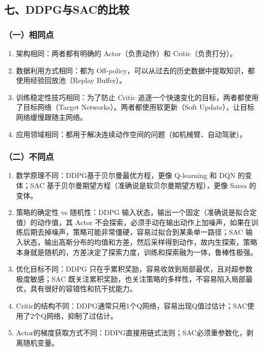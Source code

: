 \hypertarget{ux4e03ddpgux4e0esacux7684ux6bd4ux8f83}{%
\subsection{七、DDPG与SAC的比较}\label{ux4e03ddpgux4e0esacux7684ux6bd4ux8f83}}

\hypertarget{ux4e00ux76f8ux540cux70b9}{%
\subsubsection{（一）相同点}\label{ux4e00ux76f8ux540cux70b9}}

\begin{enumerate}
\def\labelenumi{\arabic{enumi}.}
\item
  架构相同：两者都有明确的 Actor（负责动作）和 Critic（负责打分）。
\item
  数据利用方式相同：都为 Off-policy，可以从过去的历史数据中提取知识，都使用经验回放池（Replay Buffer）。
\item
  训练稳定性技巧相同：为了防止 Critic 追逐一个快速变化的目标，两者都使用了目标网络（Target Networks）。两者都使用软更新（Soft Update），让目标网络缓慢跟随主网络。
\item
  应用领域相同：都用于解决连续动作空间的问题（如机械臂、自动驾驶）。
\end{enumerate}

\hypertarget{ux4e8cux4e0dux540cux70b9}{%
\subsubsection{（二）不同点}\label{ux4e8cux4e0dux540cux70b9}}

\begin{enumerate}
\def\labelenumi{\arabic{enumi}.}
\item
  数学原理不同：DDPG基于贝尔曼最优方程，更像 Q-learning 和 DQN 的变体；SAC 基于贝尔曼期望方程（准确说是软贝尔曼期望方程），更像 Sarsa 的变体。
\item
  策略的确定性 vs 随机性：DDPG 输入状态，输出一个固定（准确说是拟合定值）的动作值，其 Actor 不会探索，必须手动在输出动作上加噪声，如果在训练后期去掉噪声，策略可能非常僵硬，容易过拟合到某条单一路径；SAC 输入状态，输出高斯分布的均值和方差，然后采样得到动作，故内生探索，策略本身就是随机的，方差决定了探索力度，训练和探索融为一体，鲁棒性极强。
\item
  优化目标不同：DDPG 只在乎累积奖励，容易收敛到局部最优，且对超参数极度敏感；SAC 既关注累积奖励，也关注策略的多样性，不容易陷入局部最优，具有很好的容错性和抗干扰能力。
\item
  Critic的结构不同：DDPG通常只用1个Q网络，容易出现Q值过估计；SAC使用了2个Q网络，抑制了过估计。
\item
  Actor的梯度获取方式不同：DDPG直接用链式法则；SAC必须重参数化，剥离随机变量。
\end{enumerate}

